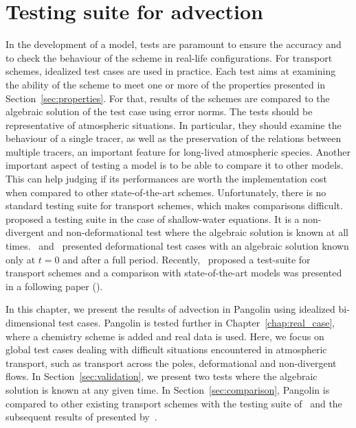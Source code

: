 \chapter{Testing suite for advection}
\label{chap:testing}

In the development of a model, tests are paramount to ensure the
accuracy and to check the behaviour of the scheme in real-life configurations.
For transport schemes, idealized test cases are used in practice.  Each test
aims at examining the ability of the scheme to meet one or more of the
properties presented in Section~\ref{sec:properties}. For that, results of
the schemes are compared to the algebraic solution of the test case using error
norms. The tests should be representative of atmospheric situations. In
particular, they should examine the behaviour of a single tracer, as well as the
preservation of the relations between multiple tracers, an important feature for
long-lived atmospheric species. 
Another important aspect of testing a model is to be able to compare it to other
models. This can help judging if its performances are worth the implementation
cost when compared to other state-of-the-art schemes. Unfortunately, there is no
standard testing suite for transport schemes, which makes comparisons difficult.
\cite{Williamson1992} proposed a testing suite in the case of shallow-water
equations. It is a non-divergent and non-deformational test where the algebraic
solution is known at all times.~\cite{Nair2002} and~\cite{Nair2008} presented
deformational test cases with an algebraic solution known only at $t=0$ and after a
full period. Recently,~\cite{Lauritzen2012} proposed a test-suite for transport schemes
and a comparison with state-of-the-art models was presented in a following
paper (\cite{Lauritzen2014}).

In this chapter, we present the results of advection in Pangolin using idealized
bi-dimensional test cases. Pangolin is tested further in Chapter~\ref{chap:real_case}, where a
chemistry scheme is added and real data is used.  Here, we focus on
global test cases dealing with difficult situations encountered in atmospheric
transport, such as transport across the poles, deformational and non-divergent
flows. In Section~\ref{sec:validation}, we present two tests where the 
algebraic solution is known at any given time. In Section~\ref{sec:comparison},
Pangolin is compared to other existing transport schemes with the testing suite
of~\cite{Lauritzen2012} and the subsequent results of presented by~\cite{Lauritzen2014}.

